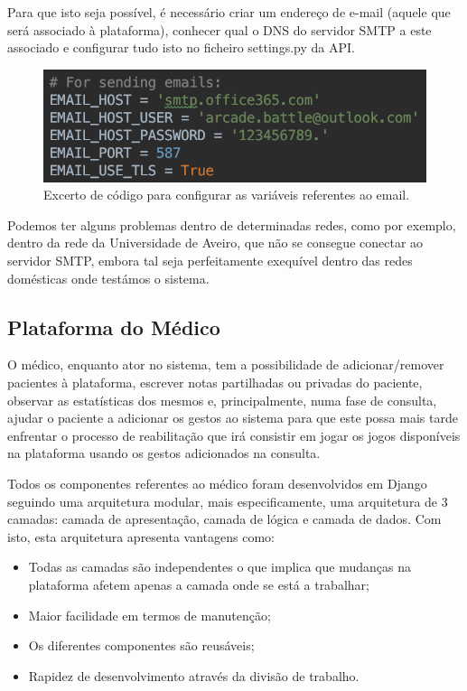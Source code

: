 \documentclass{TTUPhD}
\begin{document}
Para que isto seja possível, é necessário criar um endereço de e-mail (aquele que será associado à plataforma), conhecer qual o DNS do servidor SMTP a este associado e configurar tudo isto no ficheiro settings.py da API.

\begin{figure}[h!]
    \center
    \includegraphics[scale=0.65]{./img/rest4.png}
    \caption{Excerto de código para configurar as variáveis referentes ao email.}
    \label{fig:rest4}
\end{figure}

Podemos ter alguns problemas dentro de determinadas redes, como por exemplo, dentro da rede da Universidade de Aveiro, que não se consegue conectar ao servidor SMTP, embora tal seja perfeitamente exequível dentro das redes domésticas onde testámos o sistema.

\subsection{Plataforma do Médico}

O médico, enquanto ator no sistema, tem a possibilidade de adicionar/remover pacientes à plataforma, escrever notas partilhadas ou privadas do paciente,
observar as estatísticas dos mesmos e, principalmente, numa fase de consulta, ajudar o paciente a adicionar os gestos ao sistema para que este possa mais
tarde enfrentar o processo de reabilitação que irá consistir em jogar os jogos disponíveis na plataforma usando os gestos adicionados na consulta.

Todos os componentes referentes ao médico foram desenvolvidos em Django seguindo uma arquitetura modular, mais especificamente, uma arquitetura de 3 camadas:
camada de apresentação, camada de lógica e camada de dados. Com isto, esta arquitetura apresenta vantagens como:

\begin{itemize}
    \item Todas as camadas são independentes o que implica que mudanças na plataforma afetem apenas a camada onde se está a trabalhar;
    \item Maior facilidade em termos de manutenção;
    \item Os diferentes componentes são reusáveis;
    \item Rapidez de desenvolvimento através da divisão de trabalho.
\end{itemize}
\end{document}
